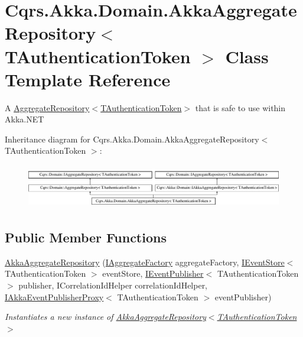 \hypertarget{classCqrs_1_1Akka_1_1Domain_1_1AkkaAggregateRepository}{}\section{Cqrs.\+Akka.\+Domain.\+Akka\+Aggregate\+Repository$<$ T\+Authentication\+Token $>$ Class Template Reference}
\label{classCqrs_1_1Akka_1_1Domain_1_1AkkaAggregateRepository}


A \hyperlink{classCqrs_1_1Domain_1_1AggregateRepository_a12a5588533a7eb2cdd061576ad53c8ac_a12a5588533a7eb2cdd061576ad53c8ac}{Aggregate\+Repository$<$\+T\+Authentication\+Token$>$} that is safe to use within Akka.\+N\+ET  


Inheritance diagram for Cqrs.\+Akka.\+Domain.\+Akka\+Aggregate\+Repository$<$ T\+Authentication\+Token $>$\+:\begin{figure}[H]
\begin{center}
\leavevmode
\includegraphics[height=1.958042cm]{classCqrs_1_1Akka_1_1Domain_1_1AkkaAggregateRepository}
\end{center}
\end{figure}
\subsection*{Public Member Functions}
\begin{DoxyCompactItemize}
\item 
\hyperlink{classCqrs_1_1Akka_1_1Domain_1_1AkkaAggregateRepository_afc997ba5187ca08d3f81a0c204eda3a2_afc997ba5187ca08d3f81a0c204eda3a2}{Akka\+Aggregate\+Repository} (\hyperlink{interfaceCqrs_1_1Domain_1_1Factories_1_1IAggregateFactory}{I\+Aggregate\+Factory} aggregate\+Factory, \hyperlink{interfaceCqrs_1_1Events_1_1IEventStore}{I\+Event\+Store}$<$ T\+Authentication\+Token $>$ event\+Store, \hyperlink{interfaceCqrs_1_1Events_1_1IEventPublisher}{I\+Event\+Publisher}$<$ T\+Authentication\+Token $>$ publisher, I\+Correlation\+Id\+Helper correlation\+Id\+Helper, \hyperlink{interfaceCqrs_1_1Akka_1_1Events_1_1IAkkaEventPublisherProxy}{I\+Akka\+Event\+Publisher\+Proxy}$<$ T\+Authentication\+Token $>$ event\+Publisher)
\begin{DoxyCompactList}\small\item\em Instantiates a new instance of \hyperlink{classCqrs_1_1Akka_1_1Domain_1_1AkkaAggregateRepository_afc997ba5187ca08d3f81a0c204eda3a2_afc997ba5187ca08d3f81a0c204eda3a2}{Akka\+Aggregate\+Repository$<$\+T\+Authentication\+Token$>$} \end{DoxyCompactList}\end{DoxyCompactItemize}
